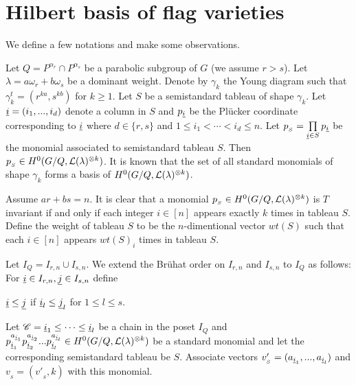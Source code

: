 %
    \section{Hilbert basis of flag varieties}
    \label{sec:fv_notations}
    We define a few notations and make some observations.

   Let \(Q = P^{\alpha_r}\cap P^{\alpha_s}\) be a parabolic subgroup of  \(G\) (we assume \(r>s\)). Let \(\lambda = a \omega_r + b \omega_s \) be a dominant weight.  Denote by \(\gamma_k\)  the Young diagram such that \(\gamma_k^t = (r^{ka},s^{kb})\) for \(k\ge1\). Let \(S\) be a semistandard tableau of shape \(\gamma_k\). 
Let \(\underline{i} = (i_1,...,i_d)\) denote a column in \(S\) and \(p_{\underline{i}}\) be the Pl\"{u}cker coordinate corresponding to \(\underline{i}\) where \(d \in \{r,s\}\) and \(1 \le i_1 < \cdots < i_d \le n\). Let \(p_{_S} = \prod\limits_{\underline{i}\in S} p_{\underline{i}}\) be the monomial associated to semistandard tableau \(S\). Then \(p_{_S} \in H^0(G/Q,{\cal L}(\lambda)^{\otimes k})\). It is known that the set of all standard monomials of shape \(\gamma_k\) forms a basis of  \(H^0(G/Q,{\cal
L}(\lambda)^{\otimes k})\).

    Assume \(ar + bs = n\). It is clear that a monomial \(p_{_S} \in H^0(G/Q,{\cal L}(\lambda)^{\otimes k})\) is \(T\) invariant if and only if each integer \(i \in [n]\) appears exactly \(k\) times in tableau \(S\). Define the weight of tableau \(S\) to be the \(n\)-dimentional vector \(wt(S)\) such that each \(i\in [n]\) appears \(wt(S)_i\) times in tableau \(S\).

    Let $I_{Q} = I_{r,n} \cup I_{s,n}$. We extend the Br\"{u}hat order on \(I_{r,n}\) and \(I_{s,n}\) to \(I_{Q}\) as follows: For \(\underline{i} \in I_{r,n}, \underline{j} \in I_{s,n}\) define 
\begin{center}
\(\underline{i} \le \underline{j}\) if \(\underline{i}_l \le \underline{j}_l\) for \(1 \le l \le s\).
\end{center}
    
    Let \(\mathscr{C} = {\underline{i}_1} \le \cdots \le  {\underline{i}_l}\) be a chain in the poset $I_Q$ and \(p_{\underline{i}_1}^{a_{\underline{i}_1}}p_{\underline{i}_2}^{a_{\underline{i}_2}}...p_{\underline{i}_l}^{a_{\underline{i}_l}} \in H^0(G/Q, {\cal L}(\lambda)^{\otimes k})\) be a standard monomial and let the corresponding semistandard tableau be \(S\). Associate vectors \(v'_{_S} = (a_{\underline{i}_1},...,a_{\underline{i}_l})\) and \(v_{_S} = (v'_{_S},k)\) with this monomial.
    
